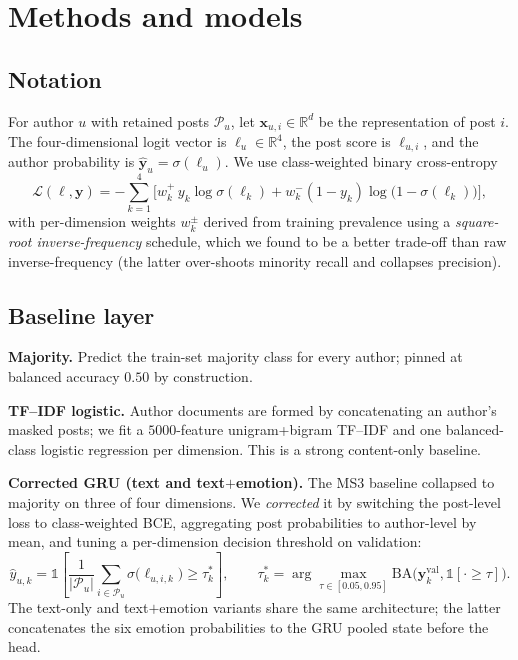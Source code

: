 \documentclass{article}
\begin{document}
\section{Methods and models}\label{sec:methods}

\subsection{Notation}
For author $u$ with retained posts $\mathcal{P}_u$, let $\mathbf{x}_{u,i} \in \mathbb{R}^d$ be the representation of post $i$. The four-dimensional logit vector is $\boldsymbol{\ell}_u \in \mathbb{R}^4$, the post score is $\boldsymbol{\ell}_{u,i}$, and the author probability is $\hat{\mathbf{y}}_u = \sigma(\boldsymbol{\ell}_u)$. We use class-weighted binary cross-entropy
\begin{equation}
  \mathcal{L}(\boldsymbol{\ell}, \mathbf{y}) = -\sum_{k=1}^{4} \Big[ w_{k}^{+}\,y_k\log\sigma(\ell_k) + w_{k}^{-}(1-y_k)\log\big(1-\sigma(\ell_k)\big) \Big],
\end{equation}
with per-dimension weights $w_{k}^{\pm}$ derived from training prevalence using a \emph{square-root inverse-frequency} schedule, which we found to be a better trade-off than raw inverse-frequency (the latter over-shoots minority recall and collapses precision).

\subsection{Baseline layer}
\textbf{Majority.} Predict the train-set majority class for every author; pinned at balanced accuracy $0.50$ by construction.

\textbf{TF--IDF logistic.} Author documents are formed by concatenating an author's masked posts; we fit a $5000$-feature unigram+bigram TF--IDF and one balanced-class logistic regression per dimension. This is a strong content-only baseline.

\textbf{Corrected GRU (text and text$+$emotion).} The MS3 baseline collapsed to majority on three of four dimensions. We \emph{corrected} it by switching the post-level loss to class-weighted BCE, aggregating post probabilities to author-level by mean, and tuning a per-dimension decision threshold on validation:
\begin{equation}
  \hat{y}_{u,k} = \mathbb{1}\!\left[\frac{1}{|\mathcal{P}_u|}\sum_{i\in\mathcal{P}_u} \sigma\big(\ell_{u,i,k}\big) \geq \tau_k^{*}\right],\qquad
  \tau_k^{*} = \arg\max_{\tau \in [0.05,0.95]} \mathrm{BA}\big(\mathbf{y}^{\text{val}}_{k}, \mathbb{1}[\cdot \geq \tau]\big).
\end{equation}
The text-only and text$+$emotion variants share the same architecture; the latter concatenates the six emotion probabilities to the GRU pooled state before the head.
\end{document}
